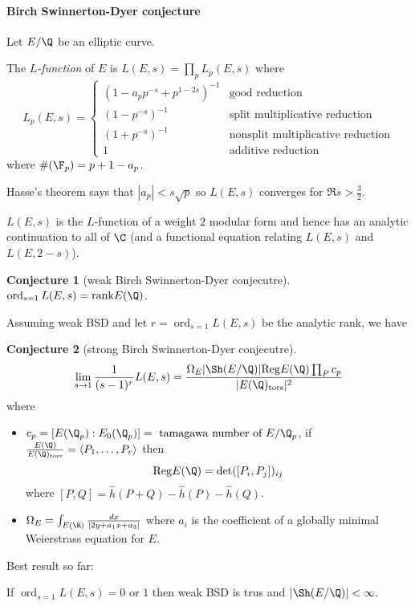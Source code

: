 \documentclass[a4paper]{article}
\theoremstyle{definition}
\theoremstyle{theorem}
\newtheorem*{conjecture}{Conjecture}
\DeclareMathOperator{\ord}{ord}
\begin{document}
\paragraph{Birch Swinnerton-Dyer conjecture}

Let \(E/\Q\) be an elliptic curve.

\begin{definition}[\(l\)-function]
  The \emph{\(L\)-function} of \(E\) is \(L(E, s) = \prod_p L_p(E, s)\) where
  \[
    L_p(E, s) =
    \begin{cases}
      (1 - a_p p^{-s} + p^{1 - 2s})^{-1} & \text{good reduction} \\
      (1 - p^{-s})^{-1} & \text{split multiplicative reduction} \\
      (1 + p^{-s})^{-1} & \text{nonsplit multiplicative reduction} \\
      1 & \text{additive reduction}
    \end{cases}
  \]
  where \(\#(\F_p) = p + 1 - a_p\).
\end{definition}

Hasse's theorem says that \(|a_p| < s \sqrt p\) so \(L(E, s)\) converges for \(\Re s > \frac{3}{2}\).

\begin{theorem}
  \(L(E, s)\) is the \(L\)-function of a weight \(2\) modular form and hence has an analytic continuation to all of \(\C\) (and a functional equation relating \(L(E, s)\) and \(L(E, 2 - s)\)).
\end{theorem}

\begin{conjecture}[weak Birch Swinnerton-Dyer conjecutre]
  \(\ord_{s = 1} L(E, s) = \mathrm{rank} E(\Q)\).
\end{conjecture}

Assuming weak BSD and let \(r = \ord_{s = 1} L(E, s)\) be the analytic rank, we have

\begin{conjecture}[strong Birch Swinnerton-Dyer conjecutre]
  \[
    \lim_{s \to 1} \frac{1}{(s - 1)^r} L(E, s) = \frac{\Omega_E |\Sh(E/\Q)| \mathrm{Reg} E(\Q) \prod_P c_p}{|E(\Q)_{\mathrm{tors}}|^2}
  \]
  where
  \begin{itemize}
  \item \(c_p = [E(\Q_p): E_0(\Q_p)] = \text{ tamagawa number of } E/\Q_p\), if \(\frac{E(\Q)}{E(\Q)_{\mathrm{tors}}} = \langle P_1, \dots, P_r \rangle\) then
    \[
      \mathrm{Reg} E(\Q) = \det ([P_i, P_j])_{ij}
    \]
    where \([P, Q] = \hat h (P + Q) - \hat h(P) - \hat h(Q)\).
  \item \(\Omega_E = \int_{E(\R)} \frac{dx}{|2y + a_1x + a_3|}\) where \(a_i\) is the coefficient of a globally minimal Weierstrass equation for \(E\).
  \end{itemize}
\end{conjecture}

Best result so far:

\begin{theorem}[Kolyragin]
  If \(\ord_{s = 1} L(E, s) = 0\) or \(1\) then weak BSD is trus and \(|\Sh (E/\Q)| < \infty\).
\end{theorem}

\printindex
\end{document}
